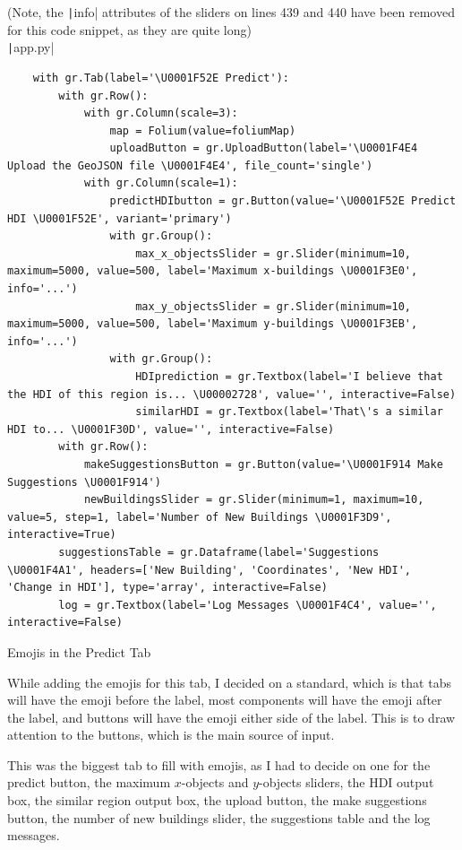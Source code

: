 \documentclass[12pt]{report}
\newcommand{\pil}[1]{\protect\texttt|#1|}
\begin{document}
\begin{listing}[H]
(Note, the \pil{info} attributes of the sliders on lines 439 and 440 have been removed for this code snippet, as they are quite long) \\
\pil{app.py}
\begin{verbatim}
    with gr.Tab(label='\U0001F52E Predict'):
        with gr.Row():
            with gr.Column(scale=3):
                map = Folium(value=foliumMap)
                uploadButton = gr.UploadButton(label='\U0001F4E4 Upload the GeoJSON file \U0001F4E4', file_count='single')
            with gr.Column(scale=1):
                predictHDIbutton = gr.Button(value='\U0001F52E Predict HDI \U0001F52E', variant='primary')
                with gr.Group():
                    max_x_objectsSlider = gr.Slider(minimum=10, maximum=5000, value=500, label='Maximum x-buildings \U0001F3E0', info='...')
                    max_y_objectsSlider = gr.Slider(minimum=10, maximum=5000, value=500, label='Maximum y-buildings \U0001F3EB', info='...')
                with gr.Group():
                    HDIprediction = gr.Textbox(label='I believe that the HDI of this region is... \U00002728', value='', interactive=False)
                    similarHDI = gr.Textbox(label='That\'s a similar HDI to... \U0001F30D', value='', interactive=False)
        with gr.Row():
            makeSuggestionsButton = gr.Button(value='\U0001F914 Make Suggestions \U0001F914')
            newBuildingsSlider = gr.Slider(minimum=1, maximum=10, value=5, step=1, label='Number of New Buildings \U0001F3D9', interactive=True)
        suggestionsTable = gr.Dataframe(label='Suggestions \U0001F4A1', headers=['New Building', 'Coordinates', 'New HDI', 'Change in HDI'], type='array', interactive=False)
        log = gr.Textbox(label='Log Messages \U0001F4C4', value='', interactive=False)
\end{verbatim}
\caption{Emojis in the Predict Tab}\label{cs:emojis2}
\end{listing}

While adding the emojis for this tab, I decided on a standard, which is that tabs will have the emoji before the label, most components will have the emoji after the label, and buttons will have the emoji either side of the label. This is to draw attention to the buttons, which is the main source of input.

This was the biggest tab to fill with emojis, as I had to decide on one for the predict button, the maximum $x$-objects and $y$-objects sliders, the HDI output box, the similar region output box, the upload button, the make suggestions button, the number of new buildings slider, the suggestions table and the log messages.
\end{document}
